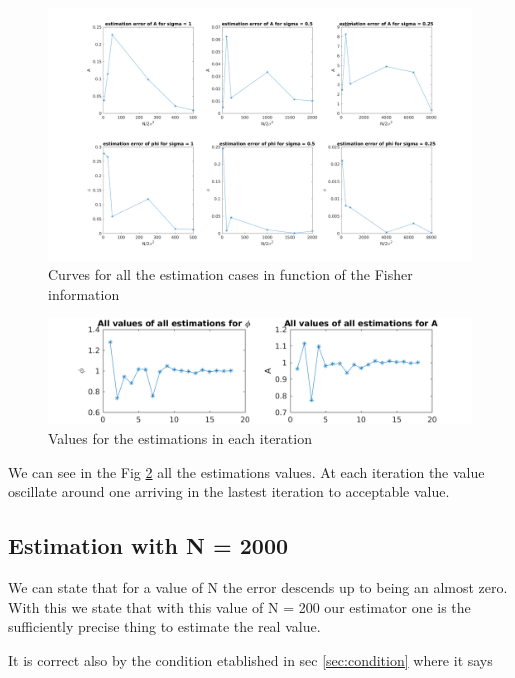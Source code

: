 \documentclass{report}
\begin{document}
\begin{figure}[h]
	\centering
	\includegraphics[width=\linewidth]{../1000_3}
	\caption{Curves for all the estimation cases in function of the Fisher information}
	\label{fig:10003}
\end{figure}


\begin{figure}[h]
	\centering
	\includegraphics[width=0.7\linewidth]{../1000_4}
	\caption{Values for the estimations in each iteration}
	\label{fig:10004}
\end{figure}
We can see in the Fig \ref{fig:10004} all the estimations values. At each iteration the value 
oscillate around one arriving in the lastest iteration to acceptable value.


\subsection{Estimation with N = 2000}



We can state that for a value of N the error descends up to being an almost zero. 
With this we state that with this value of N = 200 our estimator one is the sufficiently
precise thing to estimate the real value.

It is correct also by the condition etablished in sec \ref{sec:condition} where it says 
\end{document}
